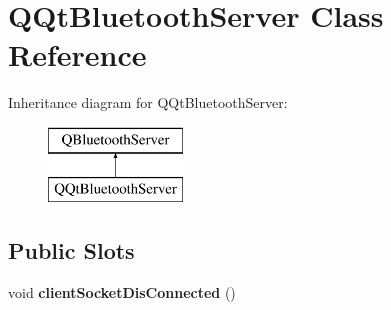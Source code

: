 \hypertarget{class_q_qt_bluetooth_server}{}\section{Q\+Qt\+Bluetooth\+Server Class Reference}
\label{class_q_qt_bluetooth_server}
Inheritance diagram for Q\+Qt\+Bluetooth\+Server\+:\begin{figure}[H]
\begin{center}
\leavevmode
\includegraphics[height=2.000000cm]{class_q_qt_bluetooth_server}
\end{center}
\end{figure}
\subsection*{Public Slots}
\begin{DoxyCompactItemize}
\item 
\mbox{\label{class_q_qt_bluetooth_server_a413986d82d81fca0acb1bbb8035d3cfb}} 
void {\bfseries client\+Socket\+Dis\+Connected} ()
\end{DoxyCompactItemize}
